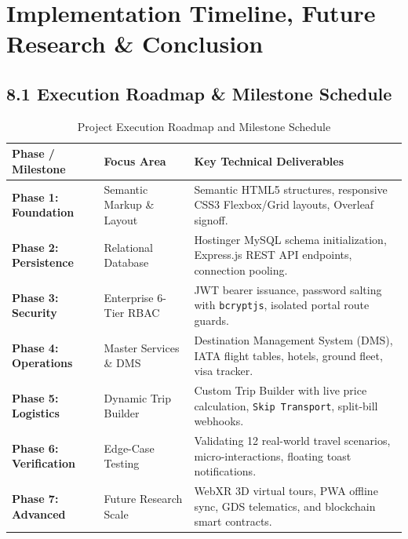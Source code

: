 \documentclass[11pt,a4paper]{article}
\begin{document}
\newpage

\section{Implementation Timeline, Future Research \& Conclusion}

\subsection{8.1 Execution Roadmap \& Milestone Schedule}
\begin{table}[H]
\centering
\scriptsize
\begin{tabularx}{\textwidth}{l p{3.8cm} X}
\toprule
\textbf{Phase / Milestone} & \textbf{Focus Area} & \textbf{Key Technical Deliverables} \\
\midrule
\textbf{Phase 1: Foundation} & Semantic Markup \& Layout & Semantic HTML5 structures, responsive CSS3 Flexbox/Grid layouts, Overleaf signoff. \\
\textbf{Phase 2: Persistence} & Relational Database & Hostinger MySQL schema initialization, Express.js REST API endpoints, connection pooling. \\
\textbf{Phase 3: Security} & Enterprise 6-Tier RBAC & JWT bearer issuance, password salting with \texttt{bcryptjs}, isolated portal route guards. \\
\textbf{Phase 4: Operations} & Master Services \& DMS & Destination Management System (DMS), IATA flight tables, hotels, ground fleet, visa tracker. \\
\textbf{Phase 5: Logistics} & Dynamic Trip Builder & Custom Trip Builder with live price calculation, \texttt{Skip Transport}, split-bill webhooks. \\
\textbf{Phase 6: Verification} & Edge-Case Testing & Validating 12 real-world travel scenarios, micro-interactions, floating toast notifications. \\
\textbf{Phase 7: Advanced} & Future Research Scale & WebXR 3D virtual tours, PWA offline sync, GDS telematics, and blockchain smart contracts. \\
\bottomrule
\end{tabularx}
\caption{Project Execution Roadmap and Milestone Schedule}
\end{table}
\end{document}
